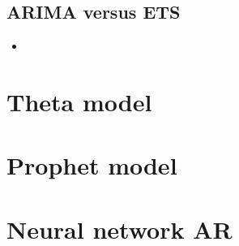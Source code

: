 \documentclass{article}
\begin{document}
\subsection{ARIMA versus ETS}
\begin{itemize}
\item 
\end{itemize}

\section{Theta model}

\section{Prophet model}

\section{Neural network AR}
\end{document}
